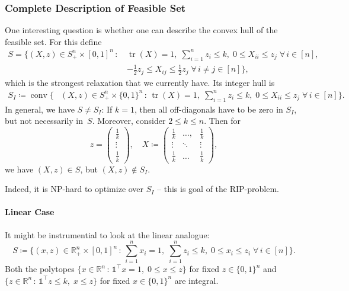 \documentclass[10pt, a4paper]{article}
\DeclareMathOperator{\conv}{conv}
\DeclareMathOperator{\tr}{tr}
\newcommand{\suchthat}{\,:\,}
\newcommand{\define}{\coloneqq}
\newcommand{\T}{^{\top}}
\newcommand{\R}{\mathds{R}}
\newcommand{\ones}{\mathds{1}}
\begin{document}
\subsubsection{Complete Description of Feasible Set}

One interesting question is whether one can describe the convex hull of the
feasible set. For this define
\begin{align*}
  S = \Big\{(X,z) \in S^n_+ \times [0,1]^n \suchthat & \tr(X) = 1,\; \sum_{i=1}^n z_i \leq k,\;     0 \leq X_{ii} \leq z_j \;\forall\, i \in [n],\\
                                                     & -\tfrac{1}{2} z_j \leq X_{ij} \leq \tfrac{1}{2} z_j \;\forall\, i \neq j \in [n] \Big\},
\end{align*}
which is the strongest relaxation that we currently have. Its integer hull is
\begin{align*}
  S_I \define \conv \Big\{& (X,z) \in S^n_+ \times \{0,1\}^n \suchthat \tr(X) =
                1,\; \sum_{i=1}^n z_i \leq k,\; 0 \leq X_{ii} \leq z_j \;\forall\, i \in [n] \Big\}.
\end{align*}
In general, we have $S \neq S_I$: If $k = 1$, then all off-diagonals have
to be zero in $S_I$, but not necessarily in~$S$. Moreover, consider
$2 \leq k \leq n$. Then for
\[
  z = \begin{pmatrix}
    \tfrac{1}{k} \\
    \vdots\\
    \tfrac{1}{k}
  \end{pmatrix},\quad
  X \define
  \begin{pmatrix}
    \tfrac{1}{k} & \dots, & \tfrac{1}{k}\\
    \vdots & \ddots & \vdots\\
    \tfrac{1}{k} & \dots & \tfrac{1}{k}
  \end{pmatrix},
\]
we have $(X,z) \in S$, but $(X,z) \notin S_I$.

Indeed, it is NP-hard to optimize over $S_I$ -- this is goal of the
RIP-problem.

\paragraph{Linear Case}

It might be instrumential to look at the linear analogue:
\[
  S \define \{(x,z) \in \R_+^n \times [0,1]^n \suchthat \sum_{i=1}^n x_i =
  1,\; \sum_{i=1}^n z_i \leq k,\; 0 \leq x_i \leq z_i \;\forall\, i \in [n]\}.
\]
Both the polytopes
$\{x \in \R^n \suchthat \ones\T x = 1,\; 0 \leq x \leq z\}$ for fixed
$z \in \{0,1\}^n$ and
$\{z \in \R^n \suchthat \ones\T z \leq k,\; x \leq z\}$ for fixed
$x \in \{0,1\}^n$ are integral.
\end{document}
